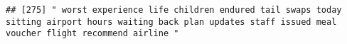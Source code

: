 \documentclass[
]{article}
\begin{document}
\begin{verbatim}
## [275] " worst experience life children endured tail swaps today sitting airport hours waiting back plan updates staff issued meal voucher flight recommend airline "                                                                                                                                                                                                                                                                                                                                                                                                                                                                                                                                                                                                                                                                                                                                                                                                                                                                                                                                                                                                                                                                                                                                                                                                                                                                                                                                                                                                                                                                                                                                                                                                                                  

\end{verbatim}
\end{document}
